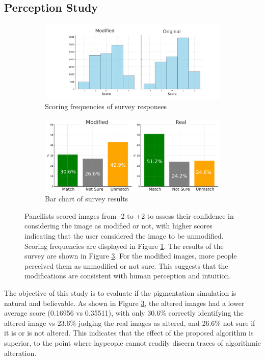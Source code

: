\begin{spacing}{1.5}
\section{Perception Study}
\begin{figure}[t!]
    \centering
    \begin{subfigure}{.9\textwidth}
        \centering
        \includegraphics[width=0.95\columnwidth]{Chapter5/score.pdf}
        \caption{Scoring frequencies of survey responses}
        \label{fig:survey_hist}
    \end{subfigure}\hfill
    \begin{subfigure}{.9\textwidth}
        \centering
        \includegraphics[width=0.95\columnwidth]{Chapter5/bar_charts_modified.pdf}
        \caption{Bar chart of survey results}
        \label{fig:bar_charts}
    \end{subfigure}
    \caption{Panellists scored images from -2 to +2 to assess their confidence in considering the image as modified or not, with higher scores indicating that the user considered the image to be unmodified. Scoring frequencies are displayed in Figure \ref{fig:survey_hist}. The results of the survey are shown in Figure \ref{fig:bar_charts}. For the modified images, more people perceived them as unmodified or not sure. This suggests that the modifications are consistent with human perception and intuition.}
\end{figure}
The objective of this study is to evaluate if the pigmentation simulation is natural and believable. As shown in Figure \ref{fig:bar_charts}, the altered images had a lower average score (0.16956 vs 0.35511), with only 30.6\% correctly identifying the altered image vs 23.6\% judging the real images as altered, and 26.6\% not sure if it is or is not altered. This indicates that the effect of the proposed algorithm is superior, to the point where laypeople cannot readily discern traces of algorithmic alteration.

\end{spacing}
\newpage
